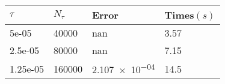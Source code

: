 \begin{tabular}{llll} 
\hline 
$\tau$  & $N_\tau$  &  Error & Times$(s)$  \\ 
\hline \hline 
5e-05  & 40000 & \num{nan} & 3.57 \\ 
2.5e-05  & 80000 & \num{nan} & 7.15 \\ 
1.25e-05  & 160000 & \num{2.107e-04} & 14.5 \\ 
\hline 
\end{tabular} 

